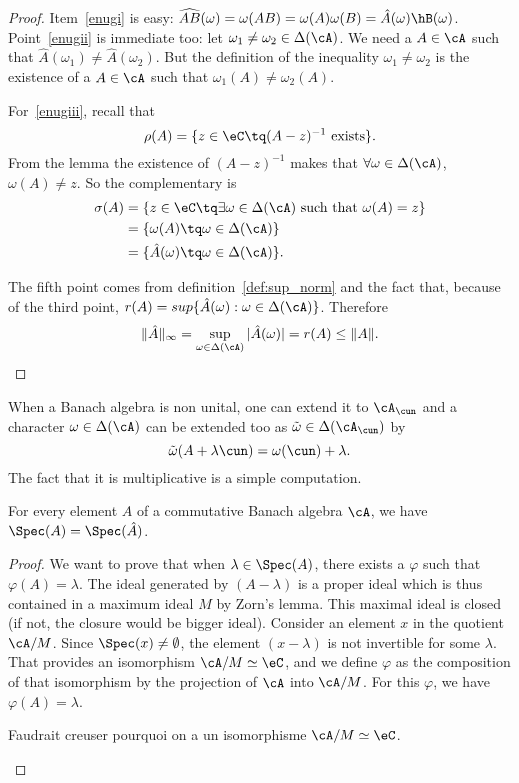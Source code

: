 \begin{proof}
Item~\ref{enugi} is easy: $\widehat{AB}(\omega)=\omega(AB)=\omega(A)\omega(B)=\hat A(\omega)\hB(\omega)$. Point~\ref{enugii} is immediate too: let $\omega_1\neq\omega_2\in\Delta(\cA)$. We need a $A\in\cA$ such that $\hat A(\omega_1)\neq\hat A(\omega_2)$. But the definition of the inequality $\omega_1\neq\omega_2$ is the existence of a $A\in\cA$ such that $\omega_1(A)\neq\omega_2(A)$.

For~\ref{enugiii}, recall that
\[
  \rho(A)=\{z\in\eC\tq(A-z)^{-1}\textrm{ exists}\}.
\]
From the lemma the existence of $(A-z)^{-1}$ makes that $\forall\omega\in\Delta(\cA)$, $\omega(A)\neq z$. So the complementary is
\begin{equation}
\begin{split}
 \sigma(A)&=\{z\in\eC\tq\exists\omega\in\Delta(\cA)\textrm{ such that }\omega(A)=z\}\\
          &=\{\omega(A)\tq\omega\in\Delta(\cA)\}\\
          &=\{\hat A(\omega)\tq\omega\in\Delta(\cA)\}.
\end{split}
\end{equation}

The fifth point comes from definition~\ref{def:sup_norm} and the fact that, because of the third point,  $r(A)=sup\{\hat A(\omega):\omega\in\Delta(\cA)\}$.
Therefore
\[
\|\hat A\|_{\infty}=\sup_{\omega\in\Delta(\cA)}|\hat A(\omega)|=r(A)\leq\|A\|.
\]
\end{proof}

When a Banach algebra is non unital, one can extend it to $\cA_{\cun}$ and a character $\omega\in\Delta(\cA)$ can be extended too as $\tilde{\omega}\in\Delta(\cA_{\cun})$ by
\[
  \tilde{\omega}(A+\lambda\cun)=\omega(\cun)+\lambda.
\]
The fact that it is multiplicative is a simple computation.

\begin{theorem}
For every element $A$ of a commutative Banach algebra $\cA$, we have $\Spec(A)=\Spec(\hat A)$.
\end{theorem}

\begin{proof}
We want to prove that when $\lambda\in\Spec(A)$, there exists a $\varphi$ such that $\varphi(A)=\lambda$. The ideal generated by $(A-\lambda)$ is a proper ideal which is thus contained in a maximum ideal $M$ by Zorn's lemma. This maximal ideal is closed (if not, the closure would be bigger ideal). Consider an element $x$ in the quotient $\cA/M$. Since $\Spec(x)\neq\emptyset$, the element $(x-\lambda)$ is not invertible for some $\lambda$. That provides an isomorphism $\cA/M\simeq \eC$, and we define $\varphi$ as the composition of that isomorphism by the projection of $\cA$ into $\cA/M$. For this $\varphi$, we have $\varphi(A)=\lambda$.

\begin{probleme}
Faudrait creuser pourquoi on a un isomorphisme $\cA/M\simeq\eC$.
\end{probleme}
\end{proof}

